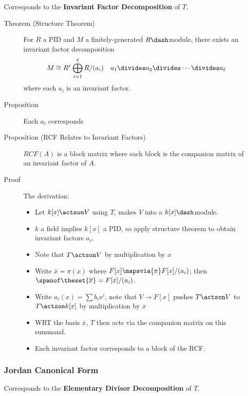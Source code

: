 Corresponds to the \textbf{Invariant Factor Decomposition} of \(T\).

\begin{description}
\item[Theorem (Structure Theorem)]
For \(R\) a PID and \(M\) a finitely-generated \(R\dash\)module, there
exists an invariant factor decomposition \begin{align*}
M \cong R^r \bigoplus_{i=1}^\ell R/(a_i) \quad a_1 \divides a_2 \divides \cdots \divides a_\ell
\end{align*} where each \(a_i\) is an invariant factor.
\item[Proposition]
Each \(a_i\) corresponds
\item[Proposition (RCF Relates to Invariant Factors)]
\(RCF(A)\) is a block matrix where each block is the companion matrix of
an invariant factor of \(A\).
\item[Proof]
The derivation:

\begin{itemize}
\item
  Let \(k[x] \actson V\) using \(T\), makes \(V\) into a
  \(k[x]\dash\)module.
\item
  \(k\) a field implies \(k[x]\) a PID, so apply structure theorem to
  obtain invariant factors \(a_i\),
\item
  Note that \(T\actson V\) by multiplication by \(x\)
\item
  Write \(\bar x = \pi(x)\) where \(F[x] \mapsvia{\pi} F[x]/(a_i)\);
  then \(\spanof\theset{\overline x} = F[x]/(a_i)\).
\item
  Write \(a_i(x) = \sum b_i x^i\), note that \(V \to F[x]\) pushes
  \(T\actson V\) to \(T\actson k[x]\) by multiplication by
  \(\overline x\)
\item
  WRT the basis \(\overline x\), \(T\) then acts via the companion
  matrix on this summand.
\item
  Each invariant factor corresponds to a block of the RCF.
\end{itemize}
\end{description}

\hypertarget{jordan-canonical-form}{%
\subsubsection{Jordan Canonical Form}\label{jordan-canonical-form}}

Corresponds to the \textbf{Elementary Divisor Decomposition} of \(T\).

